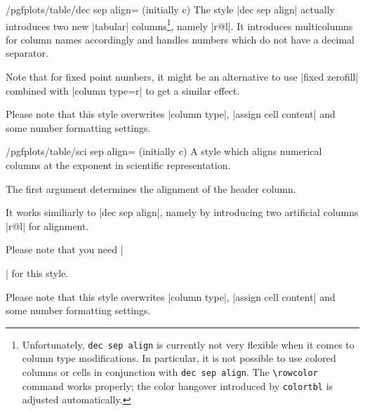 \begin{stylekey}{/pgfplots/table/dec sep align= (initially c)}
	The style |dec sep align| actually introduces two new |tabular| columns\footnote{Unfortunately, \texttt{dec sep align} is currently not very flexible when it comes to column type modifications. In particular, it is not possible to use colored columns or cells in conjunction with \texttt{dec sep align}. The \texttt{\textbackslash rowcolor} command works properly; the color hangover introduced by \texttt{colortbl} is adjusted automatically.}, namely |r@{}l|. It introduces multicolumns for column names accordingly and handles numbers which do not have a decimal separator. 
	

	Note that for fixed point numbers, it might be an alternative to use |fixed zerofill| combined with |column type=r| to get a similar effect.

	Please note that this style overwrites |column type|, |assign cell content| and some number formatting settings.
\end{stylekey}

% 
 
% 
% 
% 

\begin{stylekey}{/pgfplots/table/sci sep align= (initially c)}
	A style which aligns numerical columns at the exponent in scientific representation.

	The first argument determines the alignment of the header column. 

	It works similiarly to |dec sep align|, namely by introducing two artificial columns |r@{}l| for alignment.
	
	Please note that you need |\usepackage{array}| for this style.

	Please note that this style overwrites |column type|, |assign cell content| and some number formatting settings.
\end{stylekey}

